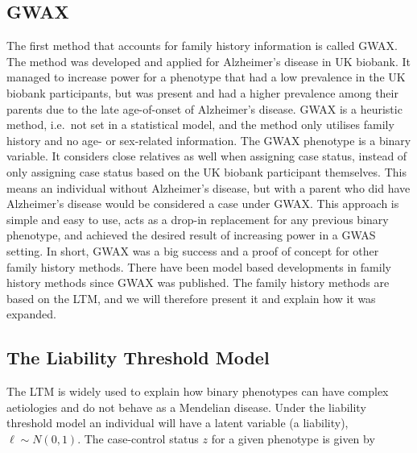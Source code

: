 \subsection{GWAX}
The first method that accounts for family history information is called GWAX. The method was developed and applied for Alzheimer's disease in UK biobank\cite{gwax}. It managed to increase power for a phenotype that had a low prevalence in the UK biobank participants, but was present and had a higher prevalence among their parents due to the late age-of-onset of Alzheimer's disease. GWAX is a heuristic method, i.e.\ not set in a statistical model, and the method only utilises family history and no age- or sex-related information. The GWAX phenotype is a binary variable. It considers close relatives as well when assigning case status, instead of only assigning case status based on the UK biobank participant themselves. This means an individual without Alzheimer's disease, but with a parent who did have Alzheimer's disease would be considered a case under GWAX. This approach is simple and easy to use, acts as a drop-in replacement for any previous binary phenotype, and achieved the desired result of increasing power in a GWAS setting. In short, GWAX was a big success and a proof of concept for other family history methods. There have been model based developments in family history methods since GWAX was published. The family history methods are based on the LTM, and we will therefore present it and explain how it was expanded.


\subsection{The Liability Threshold Model}
The LTM is widely used to explain how binary phenotypes can have complex aetiologies and do not behave as a Mendelian disease. Under the liability threshold model an individual will have a latent variable (a liability), $ \ell \sim N(0,1)$. The case-control status $ z $ for a given phenotype is given by 

